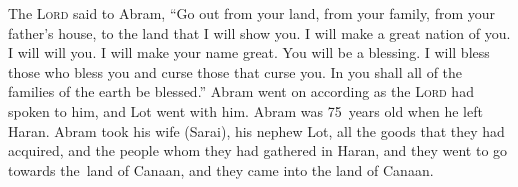 
\begin{inparaenum}
     The \textsc{Lord} said to Abram, ``Go out from your land, from your family, from your father's house, to the land that I will show you.%
     I will make a great nation of you. I will will you. I will make your name great. You will be a blessing.%
     I will bless those who bless you and curse those that curse you. In you shall all of the families of the earth be blessed.''%
     Abram went on according as the \textsc{Lord} had spoken to him, and Lot went with him. Abram was 75~years old when he left Haran.%
     Abram took his wife (Sarai), his nephew Lot, all the goods that they had acquired, and the people whom they had gathered in Haran, and they went to go towards the\understood\ land of Canaan, and they came into the land of Canaan.%
    
\end{inparaenum}
